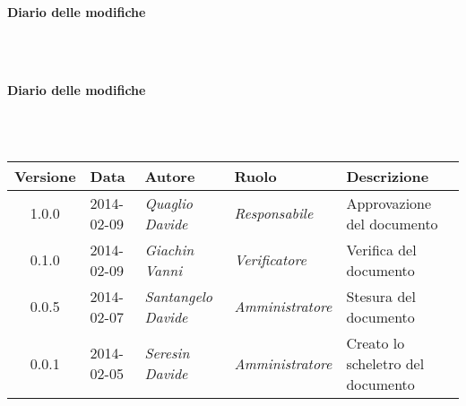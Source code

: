 \noindent\begin{Large}\textbf{Diario delle modifiche}\end{Large}\\
\\
\noindent\begin{Large}\textbf{Diario delle modifiche}\end{Large}\\
\\
\begin{small}
\begin{tabular}{|c|p{1.8cm}|p{2.8cm}|p{2.8cm}|p{3.5cm}|}
\hline
Versione & Data & Autore & Ruolo & Descrizione \\
\hline
\hline
1.0.0 & 2014-02-09 & 
\textit{Quaglio Davide} &
\textit{Responsabile} &  Approvazione del documento\\
\hline
0.1.0 & 2014-02-09 & 
\textit{Giachin Vanni} &
\textit{Verificatore} &  Verifica del documento\\
\hline
0.0.5 & 2014-02-07 & 
\textit{Santangelo Davide} &
\textit{Amministratore} &  Stesura del documento\\
\hline
0.0.1 & 2014-02-05 & 
\textit{Seresin Davide} &
\textit{Amministratore} &  Creato lo scheletro del documento\\
\hline
\end{tabular}\\
\end{small}